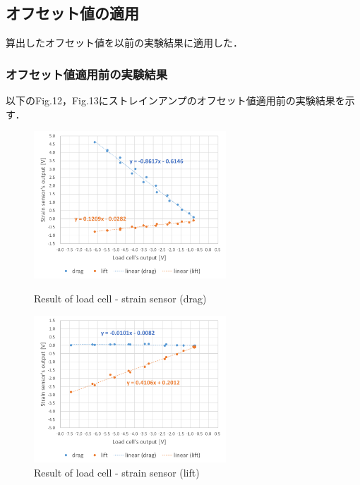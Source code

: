 \documentclass[twocolumn,a4j]{jsarticle}
\begin{document}
\subsection{オフセット値の適用}
算出したオフセット値を以前の実験結果に適用した．\\

\subsubsection*{オフセット値適用前の実験結果}
以下のFig.12，Fig.13にストレインアンプのオフセット値適用前の実験結果を示す．
\begin{figure}[htbp]
    \footnotesize
    \begin{center}
        \includegraphics[width=72mm]{../images/calibration_2_drag.png}
        \caption{Result of load cell - strain sensor (drag)}
        \includegraphics[width=72mm]{../images/calibration_2_lift.png}
        \caption{Result of load cell - strain sensor (lift)}
    \end{center}
\end{figure}

\newpage
\end{document}
